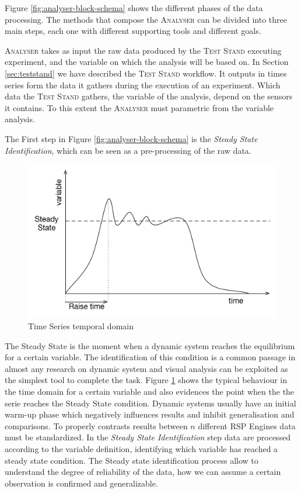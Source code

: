 Figure \ref{fig:analyser-block-schema} shows the different phases of the data processing. The methods that compose the \textsc{Analyser} can be divided into three main steps, each one with different supporting tools and different goals.

\textsc{Analyser} takes as input the raw data produced by the \textsc{Test Stand} executing experiment, and the variable on which the analysis will be based on. In Section \ref{sec:teststand} we have described the \textsc{Test Stand} workflow. It outputs in times series form the data it gathers during the execution of an experiment. Which data the \textsc{Test Stand} gathers, the variable of the analysis, depend on the sensors it contains. To this extent the \textsc{Analyser} must parametric from the variable analysis. 

The First step in Figure \ref{fig:analyser-block-schema} is the \textit{Steady State Identification}, which can be seen as a pre-processing of the raw data.

\begin{figure}[tbh]
  \centering
	\includegraphics[width=0.5\linewidth]{images/steady-state}
	\caption{Time Series temporal domain} 	
  	\label{fig:steady-state}
\end{figure}

The Steady State is the moment when a dynamic system reaches the equilibrium for a certain variable. The identification of this condition is a common passage in almost any research on dynamic system and visual analysis can be exploited as the simplest tool to complete the task. Figure \ref{fig:steady-state} shows the typical behaviour in the time domain for a certain variable and also evidences the point when the the serie reaches the Steady State condition. Dynamic systems usually have an initial warm-up phase which negatively influences results and inhibit generalisation and comparisons. To properly contrasts results between $n$ different RSP Engines data must be standardized. In the \textit{Steady State Identification} step data are processed according to the variable definition, identifying which variable has reached a steady state condition. The Steady state identification process allow to understand the degree of reliability of the data, how we can assume a certain observation is confirmed and generalizable. 


